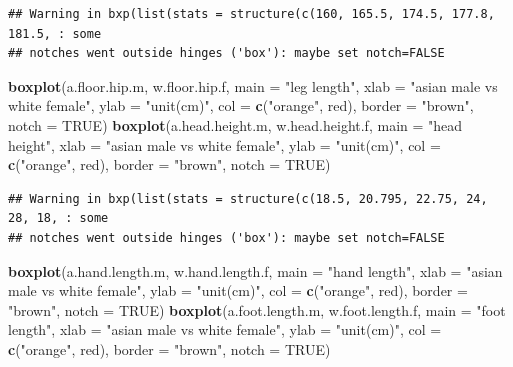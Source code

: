 \documentclass[]{article}
\newenvironment{Shaded}{\begin{snugshade}}{\end{snugshade}}
\newcommand{\DataTypeTok}[1]{\textcolor[rgb]{0.13,0.29,0.53}{#1}}
\newcommand{\KeywordTok}[1]{\textcolor[rgb]{0.13,0.29,0.53}{\textbf{#1}}}
\newcommand{\NormalTok}[1]{#1}
\newcommand{\OtherTok}[1]{\textcolor[rgb]{0.56,0.35,0.01}{#1}}
\newcommand{\StringTok}[1]{\textcolor[rgb]{0.31,0.60,0.02}{#1}}
\begin{document}
\begin{verbatim}
## Warning in bxp(list(stats = structure(c(160, 165.5, 174.5, 177.8, 181.5, : some
## notches went outside hinges ('box'): maybe set notch=FALSE
\end{verbatim}

\begin{Shaded}
\begin{Highlighting}[]
\KeywordTok{boxplot}\NormalTok{(a.floor.hip.m, w.floor.hip.f, }
        \DataTypeTok{main =} \StringTok{"leg length"}\NormalTok{,}
        \DataTypeTok{xlab =} \StringTok{"asian male vs white female"}\NormalTok{,}
        \DataTypeTok{ylab =} \StringTok{"unit(cm)"}\NormalTok{,}
        \DataTypeTok{col =} \KeywordTok{c}\NormalTok{(}\StringTok{"orange"}\NormalTok{, }\StringTok{\textquotesingle{}red\textquotesingle{}}\NormalTok{),}
        \DataTypeTok{border =} \StringTok{"brown"}\NormalTok{,}
        \DataTypeTok{notch =} \OtherTok{TRUE}\NormalTok{)}
\KeywordTok{boxplot}\NormalTok{(a.head.height.m, w.head.height.f,}
        \DataTypeTok{main =} \StringTok{"head height"}\NormalTok{,}
        \DataTypeTok{xlab =} \StringTok{"asian male vs white female"}\NormalTok{,}
        \DataTypeTok{ylab =} \StringTok{"unit(cm)"}\NormalTok{,}
        \DataTypeTok{col =} \KeywordTok{c}\NormalTok{(}\StringTok{"orange"}\NormalTok{, }\StringTok{\textquotesingle{}red\textquotesingle{}}\NormalTok{),}
        \DataTypeTok{border =} \StringTok{"brown"}\NormalTok{,}
        \DataTypeTok{notch =} \OtherTok{TRUE}\NormalTok{)}
\end{Highlighting}
\end{Shaded}

\begin{verbatim}
## Warning in bxp(list(stats = structure(c(18.5, 20.795, 22.75, 24, 28, 18, : some
## notches went outside hinges ('box'): maybe set notch=FALSE
\end{verbatim}

\begin{Shaded}
\begin{Highlighting}[]
\KeywordTok{boxplot}\NormalTok{(a.hand.length.m, w.hand.length.f,}
        \DataTypeTok{main =} \StringTok{"hand length"}\NormalTok{,}
        \DataTypeTok{xlab =} \StringTok{"asian male vs white female"}\NormalTok{,}
        \DataTypeTok{ylab =} \StringTok{"unit(cm)"}\NormalTok{,}
        \DataTypeTok{col =} \KeywordTok{c}\NormalTok{(}\StringTok{"orange"}\NormalTok{, }\StringTok{\textquotesingle{}red\textquotesingle{}}\NormalTok{),}
        \DataTypeTok{border =} \StringTok{"brown"}\NormalTok{,}
        \DataTypeTok{notch =} \OtherTok{TRUE}\NormalTok{)}
\KeywordTok{boxplot}\NormalTok{(a.foot.length.m, w.foot.length.f,}
        \DataTypeTok{main =} \StringTok{"foot length"}\NormalTok{,}
        \DataTypeTok{xlab =} \StringTok{"asian male vs white female"}\NormalTok{,}
        \DataTypeTok{ylab =} \StringTok{"unit(cm)"}\NormalTok{,}
        \DataTypeTok{col =} \KeywordTok{c}\NormalTok{(}\StringTok{"orange"}\NormalTok{, }\StringTok{\textquotesingle{}red\textquotesingle{}}\NormalTok{),}
        \DataTypeTok{border =} \StringTok{"brown"}\NormalTok{,}
        \DataTypeTok{notch =} \OtherTok{TRUE}\NormalTok{)}
\end{Highlighting}
\end{Shaded}
\end{document}
